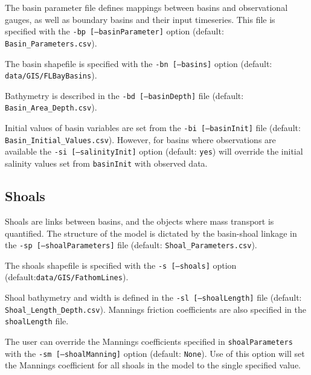 The basin parameter file defines mappings between basins and observational gauges, as well as boundary basins and their input timeseries. This file is specified with the \texttt{-bp [--basinParameter]} option (default: \texttt{Basin\_Parameters.csv}).

The basin shapefile is specified with the \texttt{-bn [--basins]} option (default: \texttt{data/GIS/FLBayBasins}).

Bathymetry is described in the \texttt{-bd [--basinDepth]} file (default: \texttt{Basin\_Area\_Depth.csv}).  

Initial values of basin variables are set from the \texttt{-bi [--basinInit]} file (default: \newline \texttt{Basin\_Initial\_Values.csv}).  However, for basins where observations are available the \texttt{-si [--salinityInit]} option (default: \texttt{yes}) will override the initial salinity values set from \texttt{basinInit} with observed data.

\subsection{Shoals}
\label{sec:Input Shoals}
Shoals are links between basins, and the objects where mass transport is quantified.  The structure of the model is dictated by the basin-shoal linkage in the \texttt{-sp [--shoalParameters]} file (default: \texttt{Shoal\_Parameters.csv}).  

The shoals shapefile is specified with the \texttt{-s [--shoals]} option (default:\newline  \texttt{data/GIS/FathomLines}). 

Shoal bathymetry and width is defined in the \texttt{-sl [--shoalLength]} file (default: \newline \texttt{Shoal\_Length\_Depth.csv}). Mannings friction coefficients are also specified in the \texttt{shoalLength} file.

The user can override the Mannings coefficients specified in \texttt{shoalParameters} with the \texttt{-sm [--shoalManning]} option (default: \texttt{None}).  Use of this option will set the Mannings coefficient for all shoals in the model to the single specified value. 

